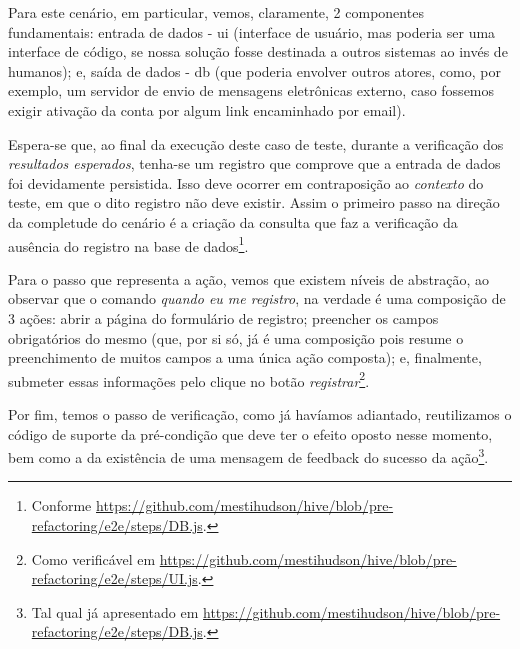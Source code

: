 
  Para este cenário, em particular, vemos, claramente, 2 componentes fundamentais: entrada de dados - ui (interface de usuário, mas poderia ser uma interface de código, se nossa solução fosse destinada a outros sistemas ao invés de humanos); e, saída de dados - db (que poderia envolver outros atores, como, por exemplo, um servidor de envio de mensagens eletrônicas externo, caso fossemos exigir ativação da conta por algum link encaminhado por email).

  Espera-se que, ao final da execução deste caso de teste, durante a verificação dos \emph{resultados esperados}, tenha-se um registro que comprove que a entrada de dados foi devidamente persistida. Isso deve ocorrer em contraposição ao \emph{contexto} do teste, em que o dito registro não deve existir. Assim o primeiro passo na direção da completude do cenário é a criação da consulta que faz a verificação da ausência do registro na base de dados\footnote{Conforme \url{https://github.com/mestihudson/hive/blob/pre-refactoring/e2e/steps/DB.js}.}.

  Para o passo que representa a ação, vemos que existem níveis de abstração, ao observar que o comando \emph{quando eu me registro}, na verdade é uma composição de 3 ações: abrir a página do formulário de registro; preencher os campos obrigatórios do mesmo (que, por si só, já é uma composição pois resume o preenchimento de muitos campos a uma única ação composta); e, finalmente, submeter essas informações pelo clique no botão \emph{registrar}\footnote{Como verificável em \url{https://github.com/mestihudson/hive/blob/pre-refactoring/e2e/steps/UI.js}.}.

  Por fim, temos o passo de verificação, como já havíamos adiantado, reutilizamos o código de suporte da pré-condição que deve ter o efeito oposto nesse momento, bem como a da existência de uma mensagem de feedback do sucesso da ação\footnote{Tal qual já apresentado em \url{https://github.com/mestihudson/hive/blob/pre-refactoring/e2e/steps/DB.js}.}.

